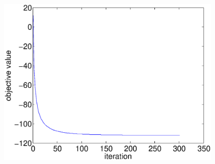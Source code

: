 \documentclass{scrartcl}
\begin{document}
\begin{figure}[H]
\begin{minipage}[b]{0.3\textwidth}
    \includegraphics[scale=0.26]{prob_28_obj_k_1000.eps}
  \end{minipage}
  

\end{figure}
\end{document}
